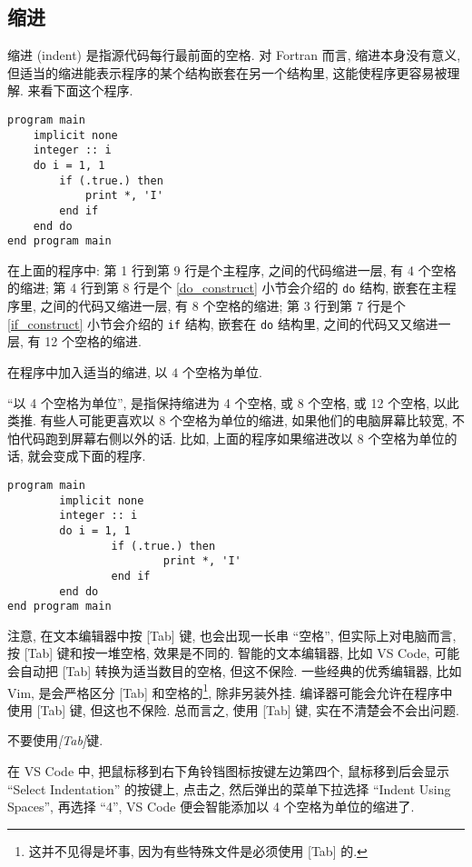 \subsection{缩进}\label{indent}

缩进 (indent) 是指源代码每行最前面的空格. 对 Fortran 而言, 缩进本身没有意义, 但适当的缩进能表示程序的某个结构嵌套在另一个结构里, 这能使程序更容易被理解. 来看下面这个程序.
\begin{lstlisting}
program main
    implicit none
    integer :: i
    do i = 1, 1
        if (.true.) then
            print *, 'I'
        end if
    end do
end program main
\end{lstlisting}
在上面的程序中: 第 1 行到第 9 行是个主程序, 之间的代码缩进一层, 有 4 个空格的缩进; 第 4 行到第 8 行是个 \ref{do_construct} 小节会介绍的 \texttt{do} 结构, 嵌套在主程序里, 之间的代码又缩进一层, 有 8 个空格的缩进; 第 3 行到第 7 行是个 \ref{if_construct} 小节会介绍的 \texttt{if} 结构, 嵌套在 \texttt{do} 结构里, 之间的代码又又缩进一层, 有 12 个空格的缩进.
\begin{convention}
    在程序中加入适当的缩进, 以 $4$ 个空格为单位.\label{fortran_indent}
\end{convention}
``以 4 个空格为单位'', 是指保持缩进为 4 个空格, 或 8 个空格, 或 12 个空格, 以此类推. 有些人可能更喜欢以 8 个空格为单位的缩进, 如果他们的电脑屏幕比较宽, 不怕代码跑到屏幕右侧以外的话. 比如, 上面的程序如果缩进改以 8 个空格为单位的话, 就会变成下面的程序.
\begin{lstlisting}
program main
        implicit none
        integer :: i
        do i = 1, 1
                if (.true.) then
                        print *, 'I'
                end if
        end do
end program main
\end{lstlisting}

注意, 在文本编辑器中按 [Tab] 键, 也会出现一长串 ``空格'', 但实际上对电脑而言, 按 [Tab] 键和按一堆空格, 效果是不同的. 智能的文本编辑器, 比如 VS Code, 可能会自动把 [Tab] 转换为适当数目的空格, 但这不保险. 一些经典的优秀编辑器, 比如 Vim, 是会严格区分 [Tab] 和空格的\footnote{
    这并不见得是坏事, 因为有些特殊文件是必须使用 [Tab] 的.
}, 除非另装外挂. 编译器可能会允许在程序中使用 [Tab] 键, 但这也不保险. 总而言之, 使用 [Tab] 键, 实在不清楚会不会出问题.
\begin{convention}
    不要使用\emph{[Tab]}键.
\end{convention}

在 VS Code 中, 把鼠标移到右下角铃铛图标按键左边第四个, 鼠标移到后会显示 ``Select Indentation'' 的按键上, 点击之, 然后弹出的菜单下拉选择 ``Indent Using Spaces'', 再选择 ``4'', VS Code 便会智能添加以 4 个空格为单位的缩进了.


